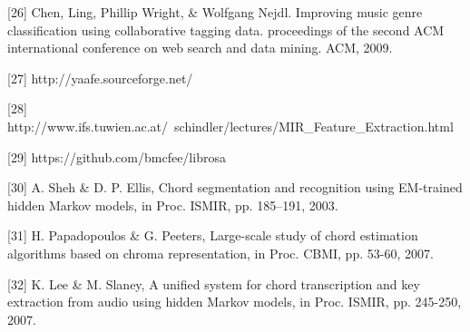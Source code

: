 \documentclass{article} %
\begin{document}
{[26] Chen, Ling, Phillip Wright, \& Wolfgang Nejdl. Improving music genre classification using collaborative tagging data. proceedings of the second ACM international conference on web search and data mining. ACM, 2009.

[27] http://yaafe.sourceforge.net/

[28] http://www.ifs.tuwien.ac.at/~schindler/lectures/MIR\_Feature\_Extraction.html

[29] https://github.com/bmcfee/librosa

[30] A. Sheh \& D. P. Ellis, Chord segmentation and recognition using EM-trained hidden Markov models, in Proc. ISMIR, pp. 185–191, 2003.

[31] H. Papadopoulos \& G. Peeters, Large-scale study of chord estimation algorithms based on chroma representation, in Proc. CBMI, pp. 53-60, 2007.

[32] K. Lee \& M. Slaney, A unified system for chord transcription and key extraction from audio using hidden Markov models, in Proc. ISMIR, pp. 245-250, 2007.
%
}
\end{document}
